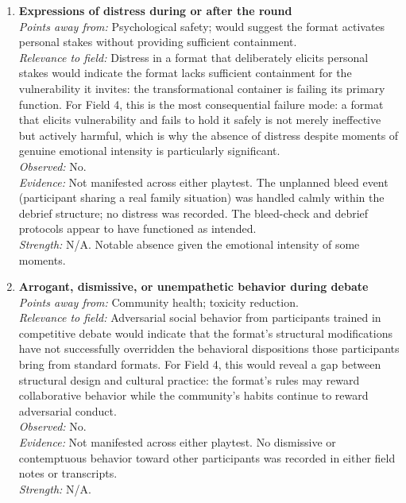\begin{enumerate}

\item \textbf{Expressions of distress during or after the round}\\
\textit{Points away from:} Psychological safety; would suggest the format activates personal stakes without providing sufficient containment.\\
\textit{Relevance to field:} Distress in a format that deliberately elicits personal stakes would indicate the format lacks sufficient containment for the vulnerability it invites: the transformational container is failing its primary function. For Field 4, this is the most consequential failure mode: a format that elicits vulnerability and fails to hold it safely is not merely ineffective but actively harmful, which is why the absence of distress despite moments of genuine emotional intensity is particularly significant.\\
\textit{Observed:} No.\\
\textit{Evidence:} Not manifested across either playtest. The unplanned bleed event (participant sharing a real family situation) was handled calmly within the debrief structure; no distress was recorded. The bleed-check and debrief protocols appear to have functioned as intended.\\
\textit{Strength:} N/A. Notable absence given the emotional intensity of some moments.

\item \textbf{Arrogant, dismissive, or unempathetic behavior during debate}\\
\textit{Points away from:} Community health; toxicity reduction.\\
\textit{Relevance to field:} Adversarial social behavior from participants trained in competitive debate would indicate that the format's structural modifications have not successfully overridden the behavioral dispositions those participants bring from standard formats. For Field 4, this would reveal a gap between structural design and cultural practice: the format's rules may reward collaborative behavior while the community's habits continue to reward adversarial conduct.\\
\textit{Observed:} No.\\
\textit{Evidence:} Not manifested across either playtest. No dismissive or contemptuous behavior toward other participants was recorded in either field notes or transcripts.\\
\textit{Strength:} N/A.


\end{enumerate}

